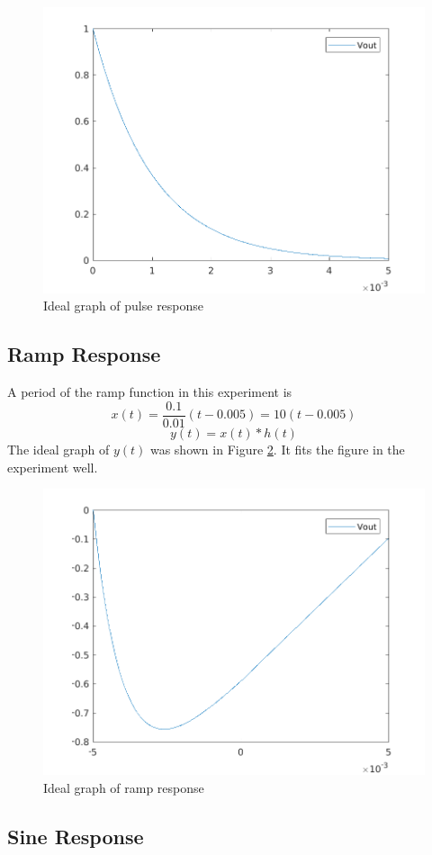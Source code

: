 \documentclass{article}
\begin{document}
\begin{figure}[htbp]
	\centering
	\includegraphics[width=0.7\linewidth]{ideal_2.png}
	\caption{Ideal graph of pulse response}
	\label{fig-2-ideal}
\end{figure}

\newpage

\subsection{Ramp Response}

A period of the ramp function in this experiment is
$$x(t)=\frac{0.1}{0.01}(t-0.005)=10(t-0.005)$$
$$y(t)=x(t)*h(t)$$
The ideal graph of $y(t)$ was shown in Figure \ref{fig-3-ideal}. It fits the figure in the experiment well.

\begin{figure}[htbp]
	\centering
	\includegraphics[width=0.7\linewidth]{ideal_3.png}
	\caption{Ideal graph of ramp response}
	\label{fig-3-ideal}
\end{figure}

\subsection{Sine Response}
\end{document}
